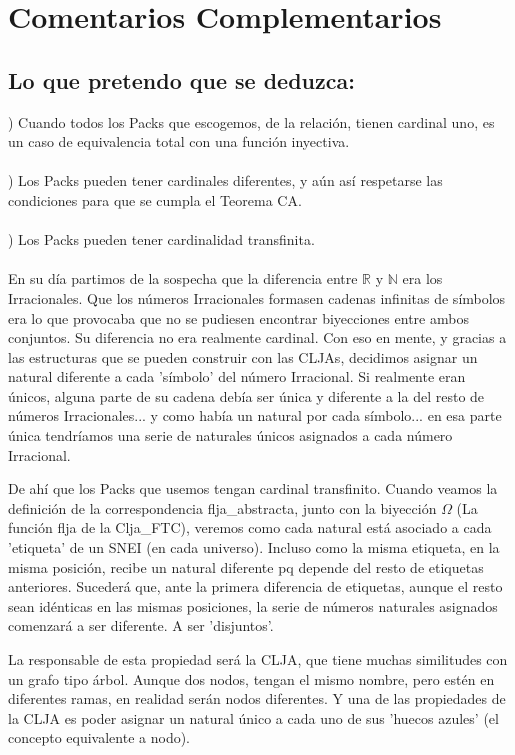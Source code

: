 \chapter[Ordenados por referencias, no por aparición]{Comentarios Complementarios}

\section {Lo que pretendo que se deduzca:}

) Cuando todos los Packs que escogemos, de la relación, tienen cardinal uno, es un caso de equivalencia total con una función inyectiva.\\\\
) Los Packs pueden tener cardinales diferentes, y aún así respetarse las condiciones para que se cumpla el Teorema CA.\\\\
) Los Packs pueden tener cardinalidad transfinita.\\\\

En su día partimos de la sospecha que la diferencia entre $\mathbb{R}$ y $\mathbb{N}$ era los Irracionales. Que los números Irracionales formasen cadenas infinitas de símbolos era lo que provocaba que no se pudiesen encontrar biyecciones entre ambos conjuntos. Su diferencia no era realmente cardinal. Con eso en mente, y gracias a las estructuras que se pueden construir con las CLJAs, decidimos asignar un natural diferente a cada 'símbolo' del número Irracional. Si realmente eran únicos, alguna parte de su cadena debía ser única y diferente a la del resto de números Irracionales... y como había un natural por cada símbolo... en esa parte única tendríamos una serie de naturales únicos asignados a cada número Irracional.

De ahí que los Packs que usemos tengan cardinal transfinito. Cuando veamos la definición de la correspondencia flja\_abstracta, junto con la biyección $\Omega$ (La función flja de la Clja\_FTC), veremos como cada natural está asociado a cada 'etiqueta' de un SNEI (en cada universo). Incluso como la misma etiqueta, en la misma posición, recibe un natural diferente pq depende del resto de etiquetas anteriores. Sucederá que, ante la primera diferencia de etiquetas, aunque el resto sean idénticas en las mismas posiciones, la serie de números naturales asignados comenzará a ser diferente. A ser 'disjuntos'.

La responsable de esta propiedad será la CLJA, que tiene muchas similitudes con un grafo tipo árbol. Aunque dos nodos, tengan el mismo nombre, pero estén en diferentes ramas, en realidad serán nodos diferentes. Y una de las propiedades de la CLJA es poder asignar un natural único a cada uno de sus 'huecos azules' (el concepto equivalente a nodo).

